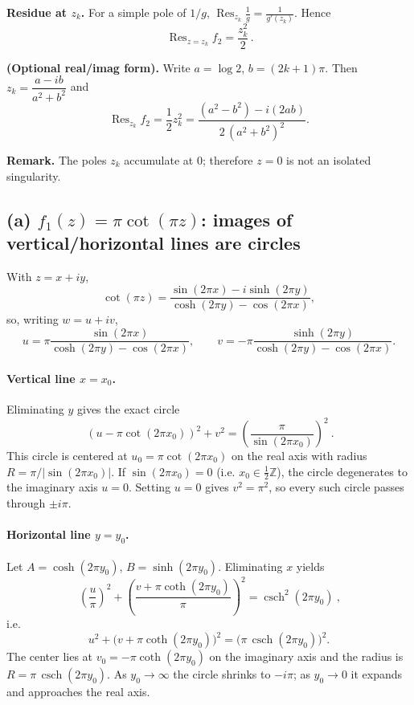\documentclass[12pt,a4paper]{article}
\DeclareMathOperator{\csch}{csch}
\begin{document}
	\medskip
	\textbf{Residue at \(z_k\).} For a simple pole of \(1/g\), \(\operatorname{Res}_{z_k} \frac{1}{g}=\frac{1}{g'(z_k)}\). Hence
	\[
	\boxed{\,\operatorname{Res}_{z=z_k} f_2=\frac{z_k^{2}}{2}\, }.
	\]
	
	\medskip
	\textbf{(Optional real/imag form).} Write \(a=\log 2\), \(b=(2k+1)\pi\).
	Then \(z_k=\dfrac{a-ib}{a^2+b^2}\) and
	\[
	\operatorname{Res}_{z_k} f_2
	=\frac{1}{2}z_k^2
	=\frac{(a^2-b^2)-i(2ab)}{2\,(a^2+b^2)^2}.
	\]
	
	\medskip
	\textbf{Remark.} The poles \(z_k\) accumulate at \(0\); therefore \(z=0\) is not an isolated singularity.
	
	\subsection*{(a) \(\displaystyle f_1(z)=\pi\cot(\pi z)\): images of vertical/horizontal lines are circles}
	
	With \(z=x+iy\),
	\[
	\cot(\pi z)=\frac{\sin(2\pi x)-i\sinh(2\pi y)}{\cosh(2\pi y)-\cos(2\pi x)},
	\]
	so, writing \(w=u+iv\),
	\[
	u=\pi\frac{\sin(2\pi x)}{\cosh(2\pi y)-\cos(2\pi x)},
	\qquad
	v=-\pi\frac{\sinh(2\pi y)}{\cosh(2\pi y)-\cos(2\pi x)}.
	\]
	
	\paragraph{Vertical line \(x=x_0\).}
	Eliminating \(y\) gives the exact circle
	\[
	\boxed{\ (u-\pi\cot(2\pi x_0))^{2}+v^{2}=\left(\frac{\pi}{\sin(2\pi x_0)}\right)^{2}\ }.
	\]
	This circle is centered at \(u_0=\pi\cot(2\pi x_0)\) on the real axis with radius \(R=\pi/|\sin(2\pi x_0)|\).
	If \(\sin(2\pi x_0)=0\) (i.e. \(x_0\in\tfrac12\mathbb Z\)), the circle degenerates to the imaginary axis \(u=0\).
	Setting \(u=0\) gives \(v^2=\pi^2\), so every such circle passes through \(\pm i\pi\).
	
	\paragraph{Horizontal line \(y=y_0\).}
	Let \(A=\cosh(2\pi y_0)\), \(B=\sinh(2\pi y_0)\). Eliminating \(x\) yields
	\[
	\boxed{\ \left(\frac{u}{\pi}\right)^{2}
		+\left(\frac{v+\pi\coth(2\pi y_0)}{\pi}\right)^{2}
		=\csch^{2}(2\pi y_0)\ } ,
	\]
	i.e.
	\[
	u^{2}+\bigl(v+\pi\coth(2\pi y_0)\bigr)^{2}
	=\bigl(\pi\,\csch(2\pi y_0)\bigr)^{2}.
	\]
	The center lies at \(v_0=-\pi\coth(2\pi y_0)\) on the imaginary axis and the radius is \(R=\pi\,\csch(2\pi y_0)\).
	As \(y_0\to\infty\) the circle shrinks to \(-i\pi\); as \(y_0\to 0\) it expands and approaches the real axis.
	
\end{document}
